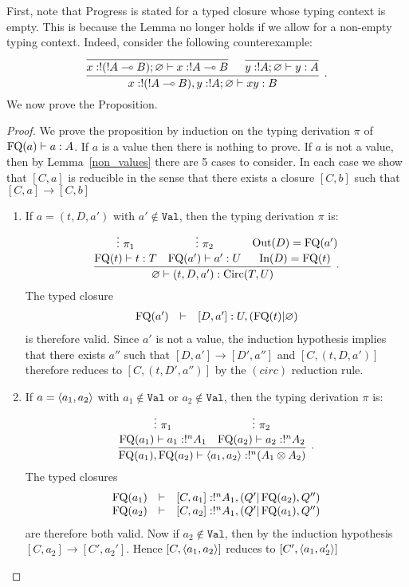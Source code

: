 \documentclass[twoside]{article}
\begin{document}
First, note that Progress is stated for a typed closure whose typing 
context is empty. This is because the Lemma no longer holds if we allow 
for a non-empty typing context. Indeed, consider the following counterexample:
\[
\infer[.]{x:!(!A\loli B), y:!A;\varnothing\entails xy:B}{
 \infer[]{x:!(!A\loli B);\varnothing\entails x:!A\loli B}{ 
 }
 &
 \infer[]{y:!A;\varnothing\entails y:A}{ 
 }
}
\]
We now prove the Proposition.

\begin{proof}
We prove the proposition by induction on the typing derivation $\pi$ of 
$\mathop{\textrm{FQ}}\nolimits(a)\vdash a:A$. If $a$ is a value then there is nothing 
to prove. If $a$ is not a value, then by 
Lemma~\hyperref[non_values]{\ref*{non_values}} there are 5 cases to consider. 
In each case we show that $[C,a]$ is reducible in the sense that there exists a 
closure  $[C,b]$ such that $[C,a]\to[C,b]$
\begin{enumerate}
  \item If $a=(t,D,a')$ with $a'\notin \mathtt{Val}$, then the typing derivation 
  $\pi$ is:
  \[
  \infer[.]{\varnothing\entails (t,D,a'):\Circ(T,U)}{
    \deduce[]{\FQ(t)\entails t:T}{
      \vdots ~\pi_1
    }
    &
    \deduce[]{\FQ(a')\entails a':U}{
      \vdots ~\pi_2     
    }
    &
    \deduce[]{\In(D)=\FQ(t)}{
      \Out(D)=\FQ(a')
    }
  }   
  \]
  The typed closure 
  \[
  \begin{array}{rcl}
  \mathop{\textrm{FQ}}\nolimits(a') & \vdash & [D,a']:U,(\mathop{\textrm{FQ}}\nolimits(t)|\varnothing)
  \end{array}
  \]
  is therefore valid. Since $a'$ 
  is not a value, the induction hypothesis implies that there exists $a''$ such 
  that $[D,a']\to [D',a'']$ and $[C,(t,D,a')]$ therefore reduces to 
  $[C,(t,D',a'')]$ by the $(circ)$ reduction rule.
  \item If $a=\langle a_1,a_2\rangle$ with $a_1\notin \mathtt{Val}$ or $a_2\notin \mathtt{Val}$,
  then the typing derivation $\pi$ is:
  \[
  \infer[.]{\FQ(a_1),\FQ(a_2)\entails \p{a_1,a_2}:!^n(A_1\x A_2)}{
    \deduce[]{\FQ(a_1)\entails a_1:!^nA_1}{
      \vdots~\pi_1
    }
    & 
    \deduce[]{\FQ(a_2)\entails a_2:!^nA_2}{
      \vdots~\pi_2
    }
  }
  \] 
  The typed closures 
  \[
  \begin{array}{rcl}
  \mathop{\textrm{FQ}}\nolimits(a_1) & \vdash & [C,a_1]:!^nA_1,(Q'|\mathop{\textrm{FQ}}\nolimits(a_2),Q'')\\
  \mathop{\textrm{FQ}}\nolimits(a_2) & \vdash & [C,a_2]:!^nA_1, (Q'|\mathop{\textrm{FQ}}\nolimits(a_1),Q'')
  \end{array}
  \]
  are therefore both valid. 
  Now if $a_2\notin\mathtt{Val}$, then by the induction hypothesis 
  $[C,a_2]\to[C',a_2']$. Hence $[C,\langle a_1,a_2\rangle]$ reduces to $[C',\langle a_1,a_2'\rangle]$ 

\end{enumerate}
\end{proof}
\end{document}
